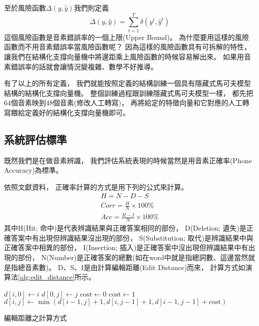     至於風險函數$\Delta(y, \hat{y})$我們則定義
    \begin{equation}
      \Delta(y, \hat{y}) = \sum_{t=1}^T \delta(y^t, \hat{y}^t) 
    \end{equation}
    這個風險函數是音素錯誤率的一個上限(Upper Bound)。
    為什麼要用這樣的風險函數而不用音素錯誤率當風險函數呢？
    因為這樣的風險函數具有可拆解的特性，
    讓我們在結構化支撐向量機中將邊距乘上風險函數的時候容易解出來。
    如果用音素錯誤率的話就會讓情況變複雜、數學不好推導。

    有了以上的所有定義，
    我們就能按照定義的結構訓練一個具有隱藏式馬可夫模型結構的結構化支撐向量機。
    整個訓練過程跟訓練隱藏式馬可夫模型一樣，
    都先把64個音素映到48個音素(修改人工轉寫)，
    再將給定的特徵向量和它對應的人工轉寫餵給定義好的結構化支撐向量機即可。

  \subsection{系統評估標準}
    既然我們是在做音素辨識，
    我們評估系統表現的時候當然是用音素正確率(Phone Accuracy)為標準。

    依照文獻資料，
    正確率計算的方式是用下列的公式來計算。
    \begin{align}
      H = N - D - S \\
      Corr = \frac{H}{N} \times 100\% \\
      Acc = \frac{H - I}{N} \times 100\% 
    \end{align}
    其中H(Hit; 命中)是代表辨識結果與正確答案相同的部份，
    D(Deletion; 遺失)是正確答案中有出現但辨識結果沒出現的部份，
    S(Substitution; 取代)是辨識結果中與正確答案中相異的部份，
    I(Insertion; 插入)是正確答案中沒出現但辨識結果中有出現的部份，
    N(Number)是正確答案的總數(如在word中就是指總詞數、這邊當然就是指總音素數)。
    D、S、I是由計算編輯距離(Edit Distance)而來，
    計算方式如演算法\ref{alg:edit_distance}所示。
    \begin{algorithm}
      \begin{algorithmic}[1]
	  \STATE $d[i, 0] \leftarrow i$
	\ENDFOR
	  \STATE $d[0, j] \leftarrow j$
	\ENDFOR
	      \STATE $\text{cost} \leftarrow 0$
	    \ELSE
	      \STATE $\text{cost} \leftarrow 1$
	    \ENDIF
	  \ENDFOR
	  \STATE $d[i,j] \leftarrow \min(d[i-1,j]+1, d[i,j-1]+1, d[i-1,j-1] + \text{cost})$
	\ENDFOR
      \end{algorithmic}
      \caption{編輯距離之計算方式}
      \label{alg:edit_distance}
    \end{algorithm}

